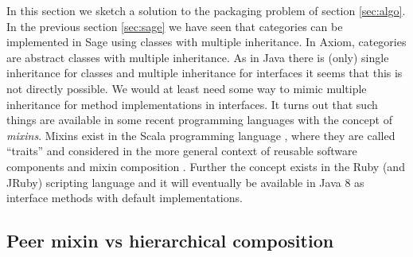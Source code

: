\documentclass{llncs}
\begin{document}

In this section we sketch a solution to the packaging problem of
section \ref{sec:algo}.  In the previous section \ref{sec:sage} we
have seen that categories can be implemented in Sage using classes
with multiple inheritance. In Axiom, categories are abstract classes
with multiple inheritance.  As in Java there is (only) single
inheritance for classes and multiple inheritance for interfaces it
seems that this is not directly possible.
%
%
We would at least need some way to mimic multiple inheritance for
method implementations in interfaces. It turns out that such things
are available in some recent programming languages with the concept
of {\em mixins}. Mixins exist in the Scala programming language
\cite{Odersky:2003}, where they are called ``traits'' and considered
in the more general context of reusable software components and mixin
composition \cite{Odersky:2005}. Further the concept exists in the
Ruby (and JRuby) \cite{Matsumo:1995} scripting language and it will
eventually be available in Java 8 as interface methods with default
implementations.


\subsection{Peer mixin vs hierarchical composition} %
\end{document}
